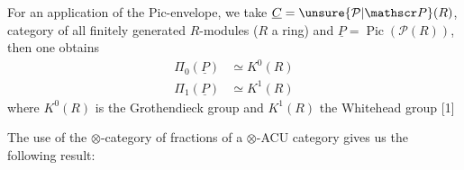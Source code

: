 For an application of the Pic-envelope, we take $\underline C=\unsure{\mathcal P|\mathscr P}(R)$, category of all finitely generated $R$-modules ($R$ a ring) and $\underline P=\operatorname{Pic}(\mathcal P(R))$, then one obtains
\[
\begin{aligned}
\Pi_0(\underline P)&\simeq K^0(R)\\
\Pi_1(\underline P)&\simeq K^1(R)
\end{aligned}
\]
where $K^0(R)$ is the Grothendieck group and $K^1(R)$ the Whitehead group [1]

The use of the $\otimes$-category of fractions of a $\otimes$-ACU category gives us the following result:
